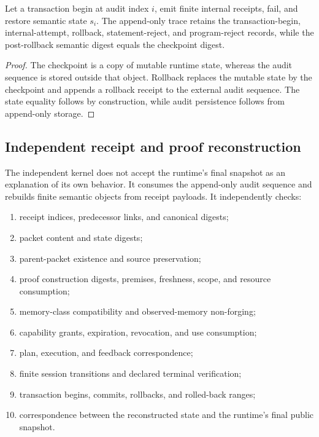 \begin{proposition}
Let a transaction begin at audit index \(i\), emit finite internal receipts, fail, and restore semantic state \(s_i\).  The append-only trace retains the transaction-begin, internal-attempt, rollback, statement-reject, and program-reject records, while the post-rollback semantic digest equals the checkpoint digest.
\end{proposition}

\begin{proof}
The checkpoint is a copy of mutable runtime state, whereas the audit sequence is stored outside that object.  Rollback replaces the mutable state by the checkpoint and appends a rollback receipt to the external audit sequence.  The state equality follows by construction, while audit persistence follows from append-only storage.  \qedhere
\end{proof}

\subsection{Independent receipt and proof reconstruction}

The independent kernel does not accept the runtime's final snapshot as an explanation of its own behavior.  It consumes the append-only audit sequence and rebuilds finite semantic objects from receipt payloads.  It independently checks:
\begin{enumerate}[leftmargin=1.7em]
  \item receipt indices, predecessor links, and canonical digests;
  \item packet content and state digests;
  \item parent-packet existence and source preservation;
  \item proof construction digests, premises, freshness, scope, and resource consumption;
  \item memory-class compatibility and observed-memory non-forging;
  \item capability grants, expiration, revocation, and use consumption;
  \item plan, execution, and feedback correspondence;
  \item finite session transitions and declared terminal verification;
  \item transaction begins, commits, rollbacks, and rolled-back ranges;
  \item correspondence between the reconstructed state and the runtime's final public snapshot.
\end{enumerate}

